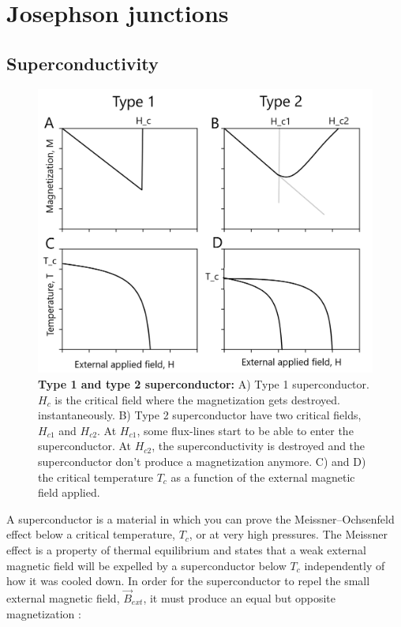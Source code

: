 \chapter{Josephson junctions}\label{chap:jj}



\section{Superconductivity}
    \begin{figure}
        \centering
        \includegraphics[width = 13cm]{Images/critical field.png}
        \caption[Type 1 and type 2 superconductor]{\textbf{Type 1 and type 2 superconductor:} A) Type 1 superconductor. $H_c$ is the critical field where the magnetization gets destroyed. instantaneously. B) Type 2 superconductor have two critical fields, $H_{c1}$ and $H_{c2}$. At $H_{c1}$, some flux-lines start to be able to enter the superconductor. At $H_{c2}$, the superconductivity is destroyed and the superconductor don't produce a magnetization anymore. C) and D) the critical temperature $T_c$ as a function of the external magnetic field applied.}
        \label{fig:type1and2}
    \end{figure}
    A superconductor is a material in which you can prove the Meissner–Ochsenfeld effect below a critical temperature, $T_c$, or at very high pressures. The Meissner effect is a property of thermal equilibrium and states that a weak external magnetic field will be expelled by a superconductor below $T_c$ independently of how it was cooled down. In order for the superconductor to repel the small external magnetic field, $\Vec{B}_{ext}$, it must produce an equal but opposite magnetization \cite{Annett2004}: 
